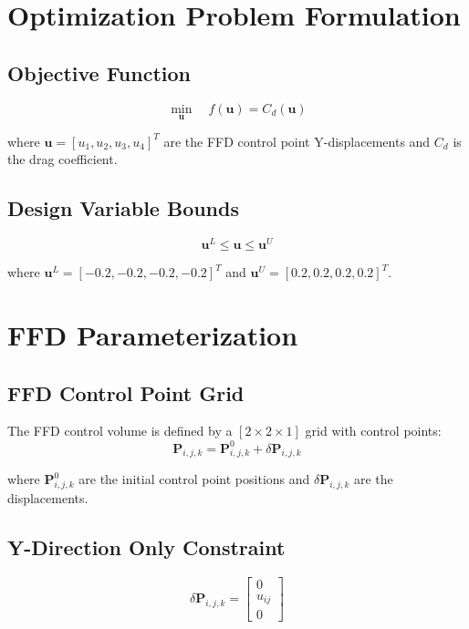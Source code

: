 \documentclass{article}
\begin{document}
\section{Optimization Problem Formulation}

\subsection{Objective Function}
\begin{equation}
\min_{\mathbf{u}} \quad f(\mathbf{u}) = C_d(\mathbf{u})
\end{equation}

where $\mathbf{u} = [u_1, u_2, u_3, u_4]^T$ are the FFD control point Y-displacements and $C_d$ is the drag coefficient.

\subsection{Design Variable Bounds}
\begin{equation}
\mathbf{u}^L \leq \mathbf{u} \leq \mathbf{u}^U
\end{equation}

where $\mathbf{u}^L = [-0.2, -0.2, -0.2, -0.2]^T$ and $\mathbf{u}^U = [0.2, 0.2, 0.2, 0.2]^T$.

\section{FFD Parameterization}

\subsection{FFD Control Point Grid}
The FFD control volume is defined by a $[2 \times 2 \times 1]$ grid with control points:
\begin{equation}
\mathbf{P}_{i,j,k} = \mathbf{P}_{i,j,k}^0 + \delta \mathbf{P}_{i,j,k}
\end{equation}

where $\mathbf{P}_{i,j,k}^0$ are the initial control point positions and $\delta \mathbf{P}_{i,j,k}$ are the displacements.

\subsection{Y-Direction Only Constraint}
\begin{equation}
\delta \mathbf{P}_{i,j,k} = \begin{bmatrix} 0 \\ u_{ij} \\ 0 \end{bmatrix}
\end{equation}
\end{document}
